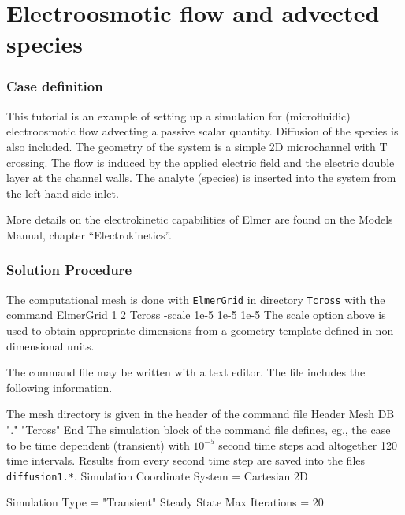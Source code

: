 \chapter{Electroosmotic flow and advected species}



\subsection*{Case definition}

This tutorial is an example of setting up a simulation for
(microfluidic) electroosmotic flow advecting a passive scalar
quantity. Diffusion of the species is also included. The geometry of
the system is a simple 2D microchannel with T crossing. The flow is
induced by the applied electric field and the electric double layer at
the channel walls. The analyte (species) is inserted into the system
from the left hand side inlet.

More details on the electrokinetic capabilities of Elmer are found on
the Models Manual, chapter ``Electrokinetics''.


\subsection*{Solution Procedure}

The computational mesh is done with \texttt{ElmerGrid} in directory
\texttt{Tcross} with the command 
%
\ttbegin
ElmerGrid 1 2 Tcross -scale 1e-5 1e-5 1e-5
\ttend
%
The scale option above is used to obtain appropriate dimensions from a
geometry template defined in non-dimensional units.

The command file may be written with a text editor. The file includes
the following information. 

The mesh directory is given in the header of the command file
%
\ttbegin
Header
  Mesh DB "." "Tcross"
End
\ttend
%
The simulation block of the command file defines, eg., the case to be time
dependent (transient) with $10^{-5}$ second time steps and altogether
120 time intervals. Results from every second time step are saved into
the files \texttt{diffusion1.*}.
%
\ttbegin
Simulation
  Coordinate System = Cartesian 2D

  Simulation Type = "Transient"
  Steady State Max Iterations = 20

